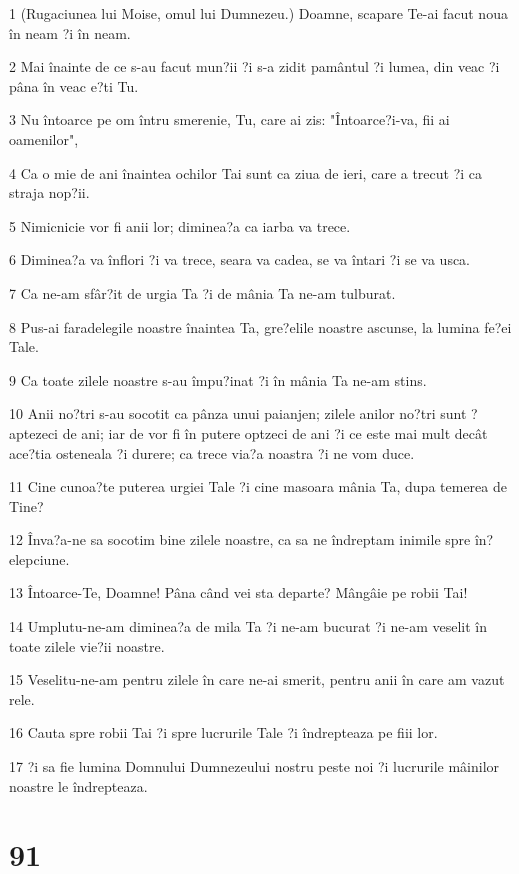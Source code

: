 \par 1 (Rugaciunea lui Moise, omul lui Dumnezeu.) Doamne, scapare Te-ai facut noua în neam ?i în neam.
\par 2 Mai înainte de ce s-au facut mun?ii ?i s-a zidit pamântul ?i lumea, din veac ?i pâna în veac e?ti Tu.
\par 3 Nu întoarce pe om întru smerenie, Tu, care ai zis: "Întoarce?i-va, fii ai oamenilor",
\par 4 Ca o mie de ani înaintea ochilor Tai sunt ca ziua de ieri, care a trecut ?i ca straja nop?ii.
\par 5 Nimicnicie vor fi anii lor; diminea?a ca iarba va trece.
\par 6 Diminea?a va înflori ?i va trece, seara va cadea, se va întari ?i se va usca.
\par 7 Ca ne-am sfâr?it de urgia Ta ?i de mânia Ta ne-am tulburat.
\par 8 Pus-ai faradelegile noastre înaintea Ta, gre?elile noastre ascunse, la lumina fe?ei Tale.
\par 9 Ca toate zilele noastre s-au împu?inat ?i în mânia Ta ne-am stins.
\par 10 Anii no?tri s-au socotit ca pânza unui paianjen; zilele anilor no?tri sunt ?aptezeci de ani; iar de vor fi în putere optzeci de ani ?i ce este mai mult decât ace?tia osteneala ?i durere; ca trece via?a noastra ?i ne vom duce.
\par 11 Cine cunoa?te puterea urgiei Tale ?i cine masoara mânia Ta, dupa temerea de Tine?
\par 12 Înva?a-ne sa socotim bine zilele noastre, ca sa ne îndreptam inimile spre în?elepciune.
\par 13 Întoarce-Te, Doamne! Pâna când vei sta departe? Mângâie pe robii Tai!
\par 14 Umplutu-ne-am diminea?a de mila Ta ?i ne-am bucurat ?i ne-am veselit în toate zilele vie?ii noastre.
\par 15 Veselitu-ne-am pentru zilele în care ne-ai smerit, pentru anii în care am vazut rele.
\par 16 Cauta spre robii Tai ?i spre lucrurile Tale ?i îndrepteaza pe fiii lor.
\par 17 ?i sa fie lumina Domnului Dumnezeului nostru peste noi ?i lucrurile mâinilor noastre le îndrepteaza.

\chapter{91}

